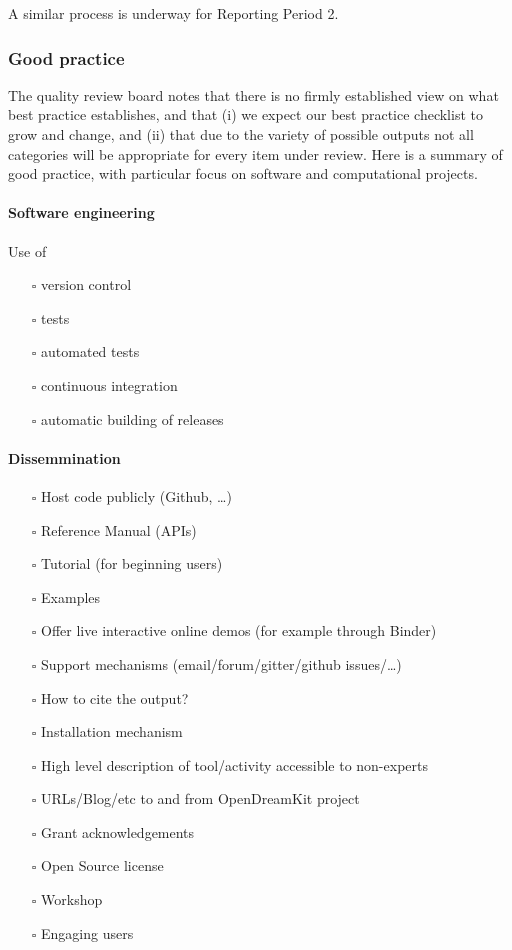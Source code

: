 A similar process is underway for Reporting Period 2.


\subsubsection{Good practice}

The quality review board notes that there is no firmly established
view on what best practice establishes, and that (i) we expect our
best practice checklist to grow and change, and (ii) that due to the
variety of possible outputs not all categories will be appropriate for
every item under review. Here is a summary of good practice, with
particular focus on software and computational projects.

\paragraph{Software engineering}
\label{sec:org2e9824e}

Use of
\begin{itemize}
\item[{$\square$}] version control
\item[{$\square$}] tests
\item[{$\square$}] automated tests
\item[{$\square$}] continuous integration
\item[{$\square$}] automatic building of releases
\end{itemize}

\paragraph{Dissemmination}
\label{sec:org1f65c9b}
\begin{itemize}
\item[{$\square$}] Host code publicly (Github, \ldots{})
\item[{$\square$}] Reference Manual (APIs)
\item[{$\square$}] Tutorial (for beginning users)
\item[{$\square$}] Examples
\item[{$\square$}] Offer live interactive online demos (for example
  through Binder)
\item[{$\square$}] Support mechanisms (email/forum/gitter/github issues/\ldots{})
\item[{$\square$}] How to cite the output?
\item[{$\square$}] Installation mechanism
\item[{$\square$}] High level description of tool/activity accessible to non-experts
\item[{$\square$}] URLs/Blog/etc to and from  OpenDreamKit project
\item[{$\square$}] Grant acknowledgements
\item[{$\square$}] Open Source license
\item[{$\square$}] Workshop
\item[{$\square$}] Engaging users
\end{itemize}


